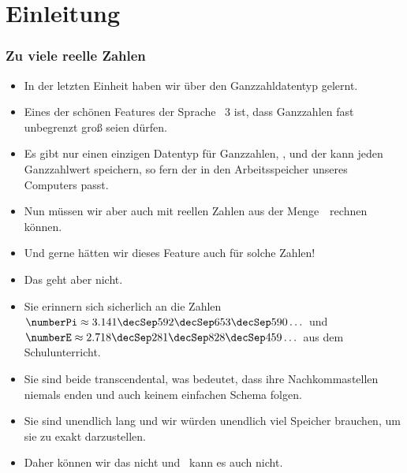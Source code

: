 \documentclass[aspectratio=169,mathserif,notheorems]{beamer}%
\subtitle{8.~Der Datentyp float}%
\begin{document}
%
%
\startPresentation%
%
\section{Einleitung}%
\begin{frame}%
\frametitle{Zu viele reelle Zahlen}%
\begin{itemize}%
\item In der letzten Einheit haben wir über den Ganzzahldatentyp  gelernt.%
\item<2-> Eines der schönen Features der Sprache \python~3 ist, dass Ganzzahlen fast unbegrenzt groß seien dürfen.
\item<3-> Es gibt nur einen einzigen Datentyp für Ganzzahlen, , und der kann jeden Ganzzahlwert speichern, so fern der in den Arbeitsspeicher unseres Computers passt.%
\item<4-> Nun müssen wir aber auch mit reellen Zahlen aus der Menge~\realNumbers\ rechnen können.%
\item<5-> Und gerne hätten wir dieses Feature auch für solche Zahlen!%
\item<6-> Das geht aber nicht.%
\item<7-> Sie erinnern sich sicherlich an die Zahlen $\numberPi\approx3.141\decSep592\decSep653\decSep590\dots$ und $\numberE\approx2.718\decSep281\decSep828\decSep459\dots$ aus dem Schulunterricht.%
\item<8-> Sie sind beide transcendental\cite{N1939TTOP,APM1991AAAFI:TOEAP,F2011TTOEAP}, was bedeutet, dass ihre Nachkommastellen niemals enden und auch keinem einfachen Schema folgen.%
\item<9-> Sie sind unendlich lang und wir würden unendlich viel Speicher brauchen, um sie zu exakt darzustellen.%
\item<10-> Daher können wir das nicht und \python\ kann es auch nicht.%
\end{itemize}%
\end{frame}%
%
\end{document}
